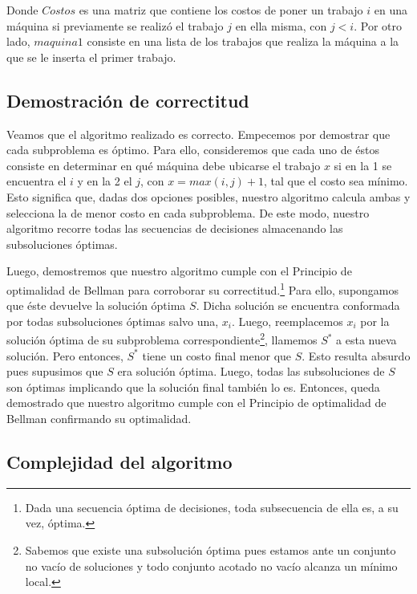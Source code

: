 Donde $Costos$ es una matriz que contiene los costos de poner un trabajo $i$ en una máquina si previamente se realizó el trabajo $j$ en ella misma, con $j<i$. Por otro lado, $maquina1$ consiste en una lista de los trabajos que realiza la máquina a la que se le inserta el primer trabajo.

\newpage
\subsection{Demostración de correctitud}

Veamos que el algoritmo realizado es correcto. Empecemos por demostrar que cada subproblema es óptimo. Para ello, consideremos que cada uno de éstos consiste en determinar en qué máquina debe ubicarse el trabajo $x$ si en la 1 se encuentra el $i$ y en la 2 el $j$, con $x=max(i,j)+1$, tal que el costo sea mínimo. Esto significa que, dadas dos opciones posibles, nuestro algoritmo calcula ambas y selecciona la de menor costo en cada subproblema. De este modo, nuestro algoritmo recorre todas las secuencias de decisiones almacenando las subsoluciones óptimas.

Luego, demostremos que nuestro algoritmo cumple con el Principio de optimalidad de Bellman para corroborar su correctitud.\footnote{Dada una secuencia óptima de decisiones, toda subsecuencia de ella es, a su vez, óptima.} Para ello, supongamos que éste devuelve la solución óptima $S$. Dicha solución se encuentra conformada por todas subsoluciones óptimas salvo una, $x_{i}$. Luego, reemplacemos $x_{i}$ por la solución óptima de su subproblema correspondiente\footnote{Sabemos que existe una subsolución óptima pues estamos ante un conjunto no vacío de soluciones y todo conjunto acotado no vacío alcanza un mínimo local.}, llamemos $S^*$ a esta nueva solución. Pero entonces, $S^*$ tiene un costo final menor que $S$. Esto resulta absurdo pues supusimos que $S$ era solución óptima. Luego, todas las subsoluciones de $S$ son óptimas implicando que la solución final también lo es. Entonces, queda demostrado que nuestro algoritmo cumple con el Principio de optimalidad de Bellman confirmando su optimalidad.

\subsection{Complejidad del algoritmo}

